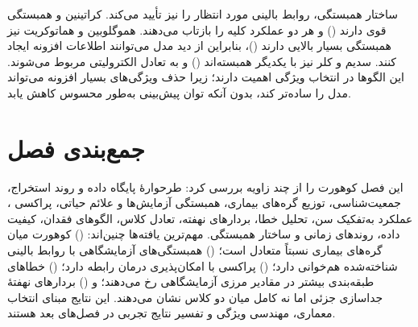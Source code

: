 ساختار همبستگی، روابط بالینی مورد انتظار را نیز تأیید می‌کند. کراتینین و  همبستگی قوی دارند (\mbox{}) و هر دو عملکرد کلیه را بازتاب می‌دهند. هموگلوبین و هماتوکریت نیز همبستگی بسیار بالایی دارند (\mbox{})، بنابراین از دید مدل می‌توانند اطلاعات افزونه ایجاد کنند. سدیم و کلر نیز با یکدیگر همبسته‌اند (\mbox{}) و به تعادل الکترولیتی مربوط می‌شوند. این الگوها در انتخاب ویژگی اهمیت دارند؛ زیرا حذف ویژگی‌های بسیار افزونه می‌تواند مدل را ساده‌تر کند، بدون آنکه توان پیش‌بینی به‌طور محسوس کاهش یابد.

\section{جمع‌بندی فصل}

این فصل کوهورت  را از چند زاویه بررسی کرد: طرحوارۀ پایگاه داده و روند استخراج، جمعیت‌شناسی، توزیع گره‌های بیماری، همبستگی آزمایش‌ها و علائم حیاتی، پراکسی ، عملکرد به‌تفکیک سن، تحلیل خطا، بردارهای نهفته، تعادل کلاس، الگوهای فقدان، کیفیت داده، روندهای زمانی و ساختار همبستگی. مهم‌ترین یافته‌ها چنین‌اند: () کوهورت میان گره‌های بیماری نسبتاً متعادل است؛ () همبستگی‌های آزمایشگاهی با روابط بالینی شناخته‌شده هم‌خوانی دارد؛ () پراکسی  با امکان‌پذیری درمان رابطه دارد؛ () خطاهای طبقه‌بندی بیشتر در مقادیر مرزی آزمایشگاهی رخ می‌دهند؛ و () بردارهای نهفتۀ  جداسازی جزئی اما نه کامل میان دو کلاس نشان می‌دهند. این نتایج مبنای انتخاب معماری، مهندسی ویژگی و تفسیر نتایج تجربی در فصل‌های بعد هستند.
